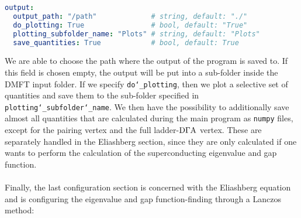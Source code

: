 \documentclass[\main/main.tex]{subfiles}
\begin{document}
\begin{minipage}{\textwidth}%
\begin{lstlisting}[language=yaml]
output:
  output_path: "/path"             # string, default: "./"
  do_plotting: True                # bool, default: "True"
  plotting_subfolder_name: "Plots" # string, default: "Plots"
  save_quantities: True            # bool, default: True
\end{lstlisting}
\end{minipage}
We are able to choose the path where the output of the program is saved to. If this field is chosen empty, the output will be put into a sub-folder inside the DMFT input folder. If we specify \texttt{do\char`_plotting}, then we plot a selective set of quantities and save them to the sub-folder specified in \texttt{plotting\char`_subfolder\char`_name}. We then have the possibility to additionally save almost all quantities that are calculated during the main program as \texttt{numpy} files, except for the pairing vertex and the full ladder-$\text{D}\Gamma\text{A}$ vertex. These are separately handled in the Eliashberg section, since they are only calculated if one wants to perform the calculation of the superconducting eigenvalue and gap function.
\\\\
Finally, the last configuration section is concerned with the Eliashberg equation and is configuring the eigenvalue and gap function-finding through a Lanczos method:
\end{document}
